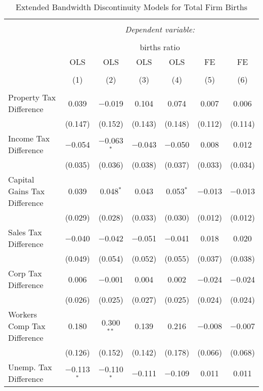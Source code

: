 
\begin{table}[!htbp] \centering 
  \caption{Extended Bandwidth Discontinuity Models for  Total Firm Births} 
  \label{--eb} 
\footnotesize 
\begin{tabular}{@{\extracolsep{5pt}}lcccccc} 
\\[-1.8ex]\hline 
\hline \\[-1.8ex] 
 & \multicolumn{6}{c}{\textit{Dependent variable:}} \\ 
\cline{2-7} 
\\[-1.8ex] & \multicolumn{6}{c}{births ratio} \\ 
 & OLS & OLS & OLS & OLS & FE & FE \\ 
\\[-1.8ex] & (1) & (2) & (3) & (4) & (5) & (6)\\ 
\hline \\[-1.8ex] 
 Property Tax Difference & 0.039 & $-$0.019 & 0.104 & 0.074 & 0.007 & 0.006 \\ 
  & (0.147) & (0.152) & (0.143) & (0.148) & (0.112) & (0.114) \\ 
  Income Tax Difference & $-$0.054 & $-$0.063$^{*}$ & $-$0.043 & $-$0.050 & 0.008 & 0.012 \\ 
  & (0.035) & (0.036) & (0.038) & (0.037) & (0.033) & (0.034) \\ 
  Capital Gains Tax Difference & 0.039 & 0.048$^{*}$ & 0.043 & 0.053$^{*}$ & $-$0.013 & $-$0.013 \\ 
  & (0.029) & (0.028) & (0.033) & (0.030) & (0.012) & (0.012) \\ 
  Sales Tax Difference & $-$0.040 & $-$0.042 & $-$0.051 & $-$0.041 & 0.018 & 0.020 \\ 
  & (0.049) & (0.054) & (0.052) & (0.055) & (0.037) & (0.038) \\ 
  Corp Tax Difference & 0.006 & $-$0.001 & 0.004 & 0.002 & $-$0.024 & $-$0.024 \\ 
  & (0.026) & (0.025) & (0.027) & (0.025) & (0.024) & (0.024) \\ 
  Workers Comp Tax Difference & 0.180 & 0.300$^{**}$ & 0.139 & 0.216 & $-$0.008 & $-$0.007 \\ 
  & (0.126) & (0.152) & (0.142) & (0.178) & (0.066) & (0.068) \\ 
  Unemp. Tax Difference & $-$0.113$^{*}$ & $-$0.110$^{*}$ & $-$0.111 & $-$0.109 & 0.011 & 0.011 \\ 

\end{tabular}
\end{table}
